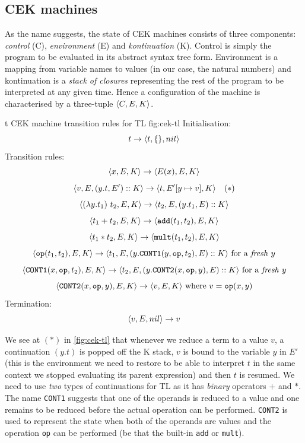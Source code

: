\documentclass[class=article, crop=false]{standalone}
\begin{document}
\subsection{CEK machines}

As the name suggests, the state of CEK machines consists of three components:
\emph{control} (C), \emph{environment} (E) and \emph{kontinuation} (K). Control
is simply the program to be evaluated in its abstract syntax tree form.
Environment is a mapping from variable names to values (in our case, the natural
numbers) and kontinuation is a \emph{stack of closures} representing the rest
of the program to be interpreted at any given time. Hence a configuration of the
machine is characterised by a three-tuple $\langle C, E, K \rangle$.

\begin{myfigure}[.9]{t}
{CEK machine transition rules for TL}
{fig:cek-tl}
\small
Initialisation:
$$ t \to \langle t, \{\}, nil \rangle $$
%
Transition rules:
$$ \langle x, E, K \rangle \to \langle E(x), E, K \rangle $$
$$ \langle v, E, (y.t, E') :: K \rangle \to \langle t, E'[y \mapsto v], K \rangle \quad (*)$$
$$ \langle (\lambda y. t_1)\ t_2, E, K \rangle \to \langle t_2, E, (y.t_1, E) :: K \rangle $$
$$ \langle t_1 + t_2, E, K \rangle \to \langle \mathtt{add}(t_1, t_2), E, K \rangle $$
$$ \langle t_1 * t_2, E, K \rangle \to \langle \mathtt{mult}(t_1, t_2), E, K \rangle $$
$$ \langle \mathtt{op}(t_1, t_2), E, K \rangle \to \langle t_1, E, (y.\mathtt{CONT1}(y, \mathtt{op}, t_2), E) :: K \rangle \text{ for a \emph{fresh} $y$} $$
$$ \langle \mathtt{CONT1}(x, \mathtt{op}, t_2), E, K \rangle \to \langle t_2, E, (y.\mathtt{CONT2}(x, \mathtt{op}, y), E) :: K \rangle \text{ for a \emph{fresh} $y$} $$
$$ \langle \mathtt{CONT2}(x, \mathtt{op}, y), E, K \rangle \to \langle v, E, K \rangle \text{ where } v = \mathtt{op}(x, y) $$
%
Termination:
$$ \langle v, E, nil \rangle \to v $$
\end{myfigure}

We see at $(*)$ in \autoref{fig:cek-tl} that whenever we reduce a term to a value $v$, a continuation
$(y.t)$ is popped off the K stack, $v$ is bound to the variable $y$ in $E'$
(this is the environment we need to restore to be able to interpret $t$ in the
same context we stopped evaluating its parent expression) and then $t$ is
resumed. We need to use \emph{two} types of continuations for TL as it has
\emph{binary} operators $+$ and $*$. The name \texttt{CONT1} suggests that one
of the operands is reduced to a value and one remains to be reduced before the
actual operation can be performed. \texttt{CONT2} is used to represent the state
when both of the operands are values and the operation \texttt{op} can be
performed (be that the built-in \texttt{add} or \texttt{mult}).
\end{document}
